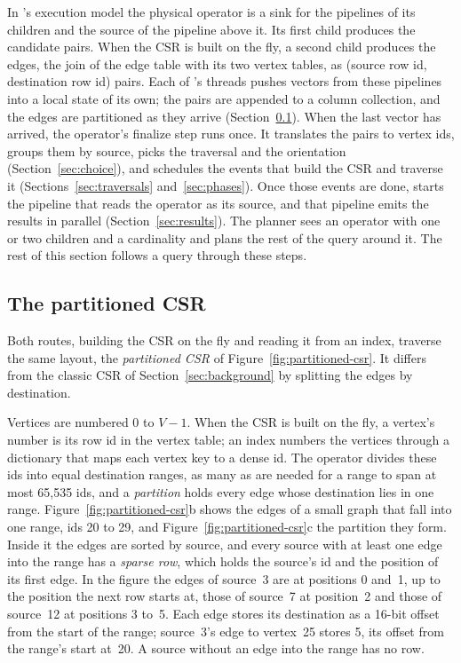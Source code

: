 In \duckdb's execution model the physical operator is a sink for the pipelines of its children and the source of
the pipeline above it. Its first child produces the candidate pairs. When the CSR is built on the fly, a second
child produces the edges, the join of the edge table with its two vertex tables, as (source row id, destination row
id) pairs. Each of \duckdb's threads pushes vectors from these pipelines into a local state of its own; the pairs
are appended to a column collection, and the edges are partitioned as they arrive (Section~\ref{sec:csr}). When the
last vector has arrived, the operator's finalize step runs once. It translates the pairs to vertex ids, groups them by
source, picks the traversal and the orientation (Section~\ref{sec:choice}), and schedules the events that build the
CSR and traverse it (Sections~\ref{sec:traversals} and~\ref{sec:phases}). Once those events are done,
\duckdb starts the pipeline that reads the operator as its source, and that pipeline emits the results in parallel
(Section~\ref{sec:results}). The planner sees an operator with one or two children and a cardinality and plans the
rest of the query around it. The rest of this section follows a query through these steps.

\subsection{The partitioned CSR}
\label{sec:csr}

Both routes, building the CSR on the fly and reading it from an index, traverse the same layout, the
\emph{partitioned CSR} of Figure~\ref{fig:partitioned-csr}. It differs from the classic CSR of Section~\ref{sec:background}
by splitting the edges by destination.

Vertices are numbered $0$ to $V-1$. When the CSR is built on the fly, a vertex's number is its row id in the vertex
table; an index numbers the vertices through a dictionary that maps each vertex key to a dense id. The operator
divides these ids into equal destination ranges, as many as are needed for a range to span at most 65,535 ids, and a
\emph{partition} holds every edge whose destination lies in one range. Figure~\ref{fig:partitioned-csr}b shows the
edges of a small graph that fall into one range, ids 20 to 29, and Figure~\ref{fig:partitioned-csr}c the partition they form. Inside it the edges are sorted by source, and every source with at least one edge into the range has a
\emph{sparse row}, which holds the source's id and the position of its first edge. In the figure the edges of
source~3 are at positions 0 and~1, up to the position the next row starts at, those of source~7 at position~2 and
those of source~12 at positions 3 to~5. Each edge stores its destination as a 16-bit offset from the start of the
range; source~3's edge to vertex~25 stores 5, its offset from the range's start at~20. A source without an edge into the
range has no row.


